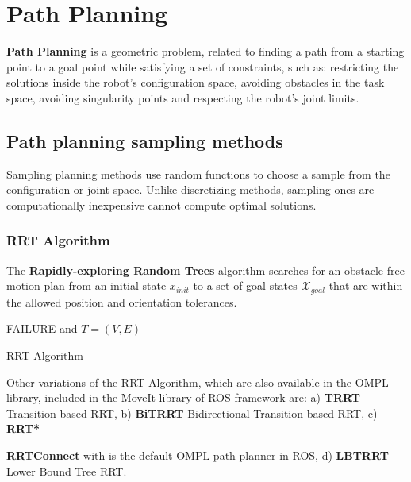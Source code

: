 \chapter{Path Planning}

\textbf{Path Planning} is a geometric problem, related to finding a path from a starting point to a goal point while satisfying a set of constraints, such as: restricting the solutions inside the robot's configuration space, avoiding obstacles in the task space, avoiding singularity points and respecting the robot's 
joint limits.
%
\section{Path planning sampling methods}
%
Sampling planning methods use random functions to choose a sample from the configuration or joint space. Unlike discretizing methods, sampling ones are 
computationally inexpensive cannot compute optimal solutions.
%
\subsection{RRT Algorithm}
%
The \textbf{Rapidly-exploring Random Trees} algorithm searches for an obstacle-free motion plan from an initial state $x_{init}$ to a set of goal states $\mathcal{X}_{goal}$ that are within the allowed position and orientation tolerances.

\small
\begin{algorithm}[H]
\SetAlgoLined
{}
\Return FAILURE and $ T=(V,E) $ \;
\caption{RRT Algorithm}
\end{algorithm}
\nprmalsize

Other variations of the RRT Algorithm, which are also available in the OMPL library, included in the MoveIt library of ROS framework  are:
a) \textbf{TRRT} Transition-based RRT, b) \textbf{BiTRRT} Bidirectional Transition-based RRT, c) \textbf{RRT*}
	\item \textbf{RRTConnect} with is the default OMPL path planner in ROS, d) \textbf{LBTRRT} Lower Bound Tree RRT.
%
